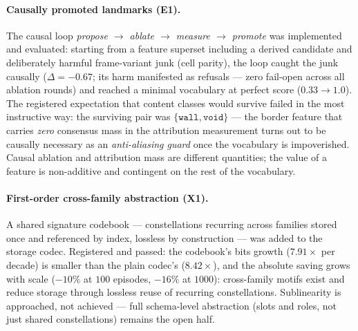 \documentclass{article}
\begin{document}
\paragraph{Causally promoted landmarks (E1).} The causal loop
\emph{propose $\to$ ablate $\to$ measure $\to$ promote} was implemented and evaluated:
starting from a feature superset including a derived candidate and
deliberately harmful frame-variant junk (cell parity), the loop
caught the junk causally ($\Delta = -0.67$; its harm manifested as
refusals --- zero fail-open across all ablation rounds) and reached a
minimal vocabulary at perfect score ($0.33 \to 1.0$). The registered
expectation that content classes would survive failed in the most
instructive way: the surviving pair was $\{\texttt{wall},
\texttt{void}\}$ --- the border feature that carries \emph{zero}
consensus mass in the attribution measurement turns out to be
causally necessary as an \emph{anti-aliasing guard} once the
vocabulary is impoverished. Causal ablation and attribution mass are
different quantities; the value of a feature is non-additive and
contingent on the rest of the vocabulary.

\paragraph{First-order cross-family abstraction (X1).} A shared
signature codebook --- constellations recurring across families
stored once and referenced by index, lossless by construction ---
was added to the storage codec. Registered and passed: the codebook's
bits growth ($7.91\times$ per decade) is smaller than the plain
codec's ($8.42\times$), and the absolute saving grows with scale
($-10\%$ at $100$ episodes, $-16\%$ at $1000$): cross-family motifs
exist and reduce storage through lossless reuse of recurring
constellations. Sublinearity is approached, not achieved ---
full schema-level abstraction (slots and roles, not just shared
constellations) remains the open half.
\end{document}
